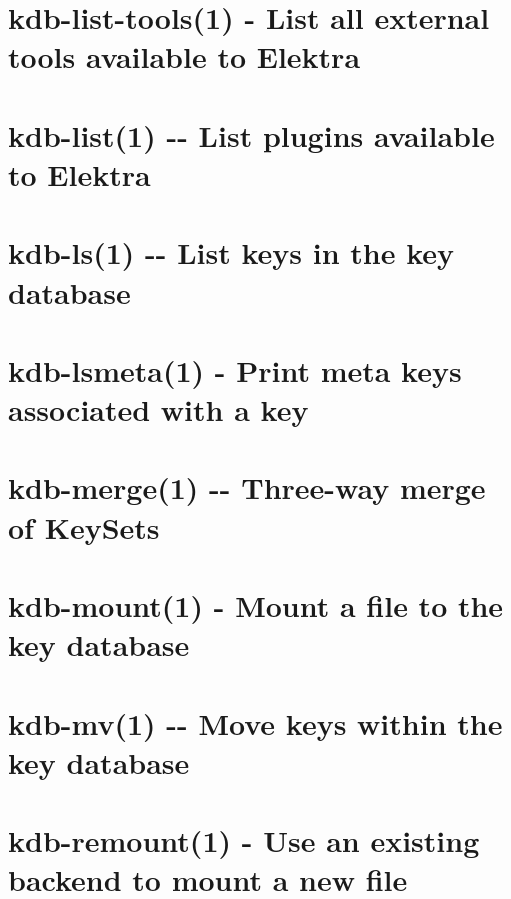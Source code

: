 \documentclass[twoside]{book}
\newcommand{\+}{\discretionary{\mbox{\scriptsize$\hookleftarrow$}}{}{}}
\begin{document}
\chapter{kdb-\/list-\/tools(1) -\/ List all external tools available to Elektra}
\label{md_doc_help_kdb-list-tools}
\hypertarget{md_doc_help_kdb-list-tools}{}

\chapter{kdb-\/list(1) -\/-\/ List plugins available to Elektra}
\label{md_doc_help_kdb-list}
\hypertarget{md_doc_help_kdb-list}{}

\chapter{kdb-\/ls(1) -\/-\/ List keys in the key database}
\label{md_doc_help_kdb-ls}
\hypertarget{md_doc_help_kdb-ls}{}

\chapter{kdb-\/lsmeta(1) -\/ Print meta keys associated with a key}
\label{md_doc_help_kdb-lsmeta}
\hypertarget{md_doc_help_kdb-lsmeta}{}

\chapter{kdb-\/merge(1) -\/-\/ Three-\/way merge of Key\+Sets}
\label{md_doc_help_kdb-merge}
\hypertarget{md_doc_help_kdb-merge}{}

\chapter{kdb-\/mount(1) -\/ Mount a file to the key database}
\label{md_doc_help_kdb-mount}
\hypertarget{md_doc_help_kdb-mount}{}

\chapter{kdb-\/mv(1) -\/-\/ Move keys within the key database}
\label{md_doc_help_kdb-mv}
\hypertarget{md_doc_help_kdb-mv}{}

\chapter{kdb-\/remount(1) -\/ Use an existing backend to mount a new file}
\label{md_doc_help_kdb-remount}
\hypertarget{md_doc_help_kdb-remount}{}

\end{document}
